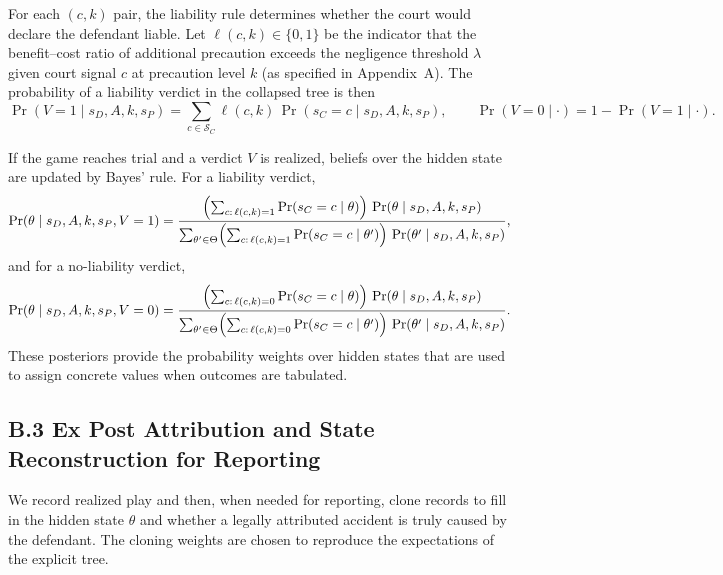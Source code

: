 \documentclass{article}
\begin{document}
For each $(c,k)$ pair, the liability rule determines whether the court would declare the defendant liable. Let $\ell(c,k)\in\{0,1\}$ be the indicator that the benefit–cost ratio of additional precaution exceeds the negligence threshold $\lambda$ given court signal $c$ at precaution level $k$ (as specified in Appendix~A). The probability of a liability verdict in the collapsed tree is then
\[
\Pr(V=1 \mid s_D, A, k, s_P)
= \sum_{c\in\mathcal{S}_C} \ell(c,k)\,
   \Pr(s_C=c \mid s_D, A, k, s_P),
\qquad
\Pr(V=0 \mid \cdot)=1-\Pr(V=1 \mid \cdot).
\]

If the game reaches trial and a verdict $V$ is realized, beliefs over the hidden state are updated by Bayes’ rule. For a liability verdict,
\[
\Pr(\theta \mid s_D, A, k, s_P, V=1)
= \frac{\Bigl(\sum_{c:\,\ell(c,k)=1}\Pr(s_C=c\mid \theta)\Bigr)\,
       \Pr(\theta \mid s_D, A, k, s_P)}
       {\sum_{\theta'\in\Theta}\Bigl(\sum_{c:\,\ell(c,k)=1}\Pr(s_C=c\mid \theta')\Bigr)\,
        \Pr(\theta' \mid s_D, A, k, s_P)},
\]
and for a no-liability verdict,
\[
\Pr(\theta \mid s_D, A, k, s_P, V=0)
= \frac{\Bigl(\sum_{c:\,\ell(c,k)=0}\Pr(s_C=c\mid \theta)\Bigr)\,
       \Pr(\theta \mid s_D, A, k, s_P)}
       {\sum_{\theta'\in\Theta}\Bigl(\sum_{c:\,\ell(c,k)=0}\Pr(s_C=c\mid \theta')\Bigr)\,
        \Pr(\theta' \mid s_D, A, k, s_P)}.
\]
These posteriors provide the probability weights over hidden states that are used to assign concrete values when outcomes are tabulated.

\subsection*{B.3 Ex Post Attribution and State Reconstruction for Reporting}

We record realized play and then, when needed for reporting, clone records to fill in the hidden state $\theta$ and whether a legally attributed accident is truly caused by the defendant. The cloning weights are chosen to reproduce the expectations of the explicit tree.
\end{document}
